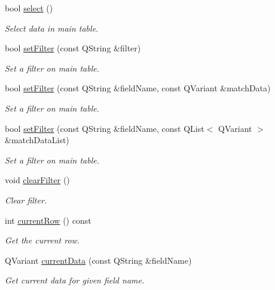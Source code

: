 \begin{DoxyCompactItemize}
bool \hyperlink{classmdt_sql_table_widget_af276a4ddd2d0effd26f979a0bcad9b82}{select} ()
\begin{DoxyCompactList}\small\item\em Select data in main table. \end{DoxyCompactList}\item 
bool \hyperlink{classmdt_sql_table_widget_a3e94f2bc74a1a706a13ec4871bd282f3}{set\-Filter} (const Q\-String \&filter)
\begin{DoxyCompactList}\small\item\em Set a filter on main table. \end{DoxyCompactList}\item 
bool \hyperlink{classmdt_sql_table_widget_ae2f9d9b259b70a66995856c54e26cf5d}{set\-Filter} (const Q\-String \&field\-Name, const Q\-Variant \&match\-Data)
\begin{DoxyCompactList}\small\item\em Set a filter on main table. \end{DoxyCompactList}\item 
bool \hyperlink{classmdt_sql_table_widget_a6606aa8a84c3bc5fb0009e4058a1c71e}{set\-Filter} (const Q\-String \&field\-Name, const Q\-List$<$ Q\-Variant $>$ \&match\-Data\-List)
\begin{DoxyCompactList}\small\item\em Set a filter on main table. \end{DoxyCompactList}\item 
void \hyperlink{classmdt_sql_table_widget_a708b8adc324600654010cc734117ae21}{clear\-Filter} ()
\begin{DoxyCompactList}\small\item\em Clear filter. \end{DoxyCompactList}\item 
int \hyperlink{classmdt_sql_table_widget_a7612cf9cb10c69365b7ed820d71e6cb2}{current\-Row} () const 
\begin{DoxyCompactList}\small\item\em Get the current row. \end{DoxyCompactList}\item 
Q\-Variant \hyperlink{classmdt_sql_table_widget_a13d3d5db07aedf14265a36c5ff2ad7cb}{current\-Data} (const Q\-String \&field\-Name)
\begin{DoxyCompactList}\small\item\em Get current data for given field name. \end{DoxyCompactList}\item 

\end{DoxyCompactItemize}
